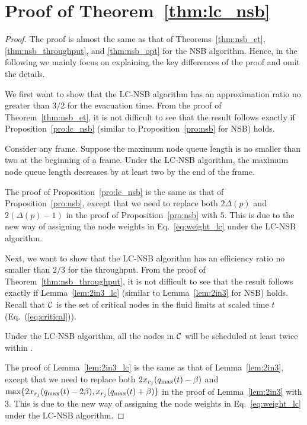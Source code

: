 \documentclass[10pt,journal,compsoc]{IEEEtran}
\newcommand{\high}[1]{{\color{black}{#1}}}
\begin{document}
\section{Proof of Theorem~\ref{thm:lc_nsb}} \label{sec:thm:lc_nsb}
\begin{proof}
The proof is almost the same as that of Theorems~\ref{thm:nsb_et}, \ref{thm:nsb_throughput}, 
and \ref{thm:nsb_opt} for the NSB algorithm.
Hence, in the following we mainly focus on explaining the key differences of the proof and omit the details.

We first want to show that the LC-NSB algorithm has an approximation ratio no greater than $3/2$ 
for the evacuation time. From the proof of Theorem~\ref{thm:nsb_et}, it is not difficult to see that 
the result follows exactly if Proposition~\ref{pro:lc_nsb} (similar to Proposition~\ref{pro:nsb} 
for NSB) holds.

\begin{proposition}
\label{pro:lc_nsb}
Consider any frame.
Suppose the maximum node queue length is no smaller than two at the beginning of a frame. 
Under the LC-NSB algorithm, the maximum node queue length decreases by at least two 
by the end of the frame.
\end{proposition}

The proof of Proposition~\ref{pro:lc_nsb} is the same as that of Proposition~\ref{pro:nsb},
except that we need to replace both $2\Delta(p)$ and $2(\Delta(p)-1)$ in the proof 
of Proposition~\ref{pro:nsb} with 5. This is due to the new way of assigning the 
node weights in Eq.~\eqref{eq:weight_lc} under the LC-NSB algorithm.

Next, we want to show that the LC-NSB algorithm has an efficiency ratio no smaller than $2/3$ for the throughput.
From the proof of Theorem~\ref{thm:nsb_throughput}, it is not difficult to see that the result follows exactly 
if Lemma~\ref{lem:2in3_lc} (similar to Lemma~\ref{lem:2in3} for NSB) holds.
Recall that $\mathcal{C}$ is the set of critical nodes in the fluid limits at scaled time $t$ (Eq.~(\ref{eq:critical})).

\begin{lemma}
\label{lem:2in3_lc}
Under the LC-NSB algorithm, all the nodes in $\mathcal{C}$ will be scheduled at least twice within 
\high{each frame of interval $T$}.
\end{lemma}

The proof of Lemma~\ref{lem:2in3_lc} is the same as that of Lemma~\ref{lem:2in3},
except that we need to replace both $2{x_{r_j}}(q_{\max}(t)-\beta)$ and $\max \{2{x_{r_j}}(q_{\max}(t)-2\beta), {x_{r_j}}(q_{\max}(t)+\beta)\}$ 
in the proof of Lemma~\ref{lem:2in3} with 3. This is due to the new way of assigning the 
node weights in Eq.~\eqref{eq:weight_lc} under the LC-NSB algorithm.
 

\end{proof}
\end{document}
